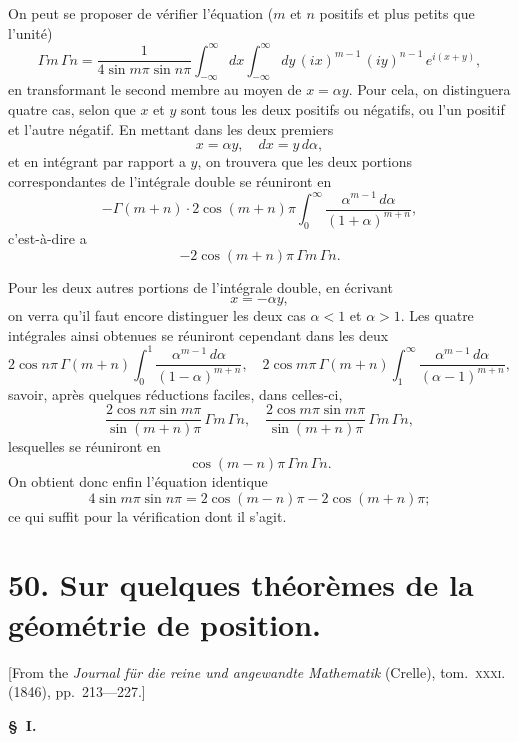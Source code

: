 \documentclass[11pt,a4paper]{book}
\begin{document}
On peut se proposer de v\'erifier l'\'equation ($m$ et $n$ positifs et plus petits que l'unit\'e)
\[
\Gamma m \, \Gamma n = \frac{1}{4\sin m\pi \sin n\pi} \int_{-\infty}^{\infty} dx \int_{-\infty}^{\infty} dy \, (ix)^{m-1}\, (iy)^{n-1}\, e^{i(x+y)},
\]
en transformant le second membre au moyen de $x = \alpha y$. Pour cela, on distinguera quatre cas, selon que $x$ et $y$ sont tous les deux positifs ou n\'egatifs, ou l'un positif et l'autre n\'egatif. En mettant dans les deux premiers
\[
x = \alpha y, \quad dx = y\, d\alpha,
\]
et en int\'egrant par rapport a $y$, on trouvera que les deux portions correspondantes de l'int\'egrale double se r\'euniront en
\[
-\Gamma(m + n) \cdot 2\cos(m + n)\pi \int_0^{\infty} \frac{\alpha^{m-1}\, d\alpha}{(1 + \alpha)^{m+n}},
\]
c'est-\`a-dire a
\[
-2\cos(m+n)\pi \, \Gamma m \, \Gamma n.
\]

Pour les deux autres portions de l'int\'egrale double, en \'ecrivant
\[
x = -\alpha y,
\]
on verra qu'il faut encore distinguer les deux cas $\alpha < 1$ et $\alpha > 1$. Les quatre int\'egrales ainsi obtenues se r\'euniront cependant dans les deux
\[
2\cos n\pi \, \Gamma(m+n) \int_0^1 \frac{\alpha^{m-1}\, d\alpha}{(1 - \alpha)^{m+n}}, \quad 2\cos m\pi \, \Gamma(m+n) \int_1^{\infty} \frac{\alpha^{m-1}\, d\alpha}{(\alpha - 1)^{m+n}},
\]
savoir, apr\`es quelques r\'eductions faciles, dans celles-ci,
\[
\frac{2\cos n\pi \sin m\pi}{\sin(m+n)\pi} \, \Gamma m \, \Gamma n, \quad \frac{2\cos m\pi \sin m\pi}{\sin(m+n)\pi} \, \Gamma m \, \Gamma n,
\]
lesquelles se r\'euniront en
\[
\cos(m-n)\pi \, \Gamma m \, \Gamma n.
\]
On obtient donc enfin l'\'equation identique
\[
4\sin m\pi \sin n\pi = 2\cos(m-n)\pi - 2\cos(m+n)\pi;
\]
ce qui suffit pour la v\'erification dont il s'agit.

\newpage


\section*{50. Sur quelques th\'eor\`emes de la g\'eom\'etrie de position.}

[From the \textit{Journal f\"ur die reine und angewandte Mathematik} (Crelle), tom.~\textsc{xxxi}. (1846), pp.~213---227.]

\bigskip

\textbf{\S\ I.}
\end{document}
